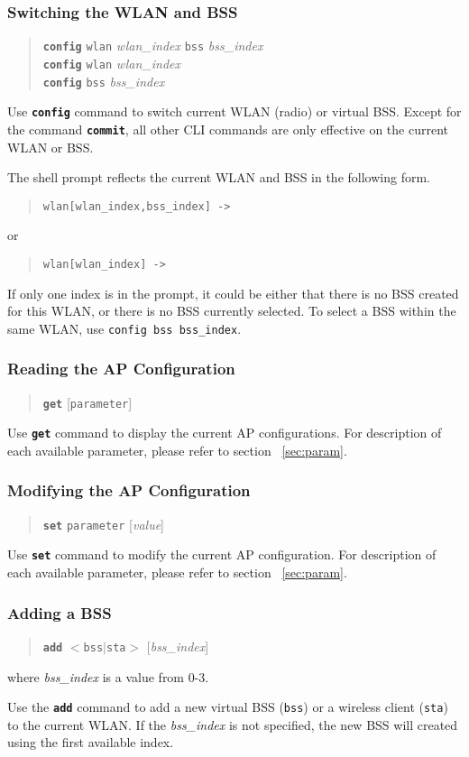 \documentclass[10pt,fullpage]{article}
\newcommand{\mytt}[1]{{\texttt{#1}}}
\newcommand{\bv}{\begin{verse}}
\newcommand{\ev}{\end{verse}}
\newcommand{\clicmd}[1]{{\textbf{\texttt{#1}}}}
\newcommand{\cliparam}[1]{{\texttt{#1}}}
\newcommand{\clival}[1]{{\emph{#1}}}
\begin{document}
\subsubsection{Switching the WLAN and BSS}
\bv
\clicmd{config} \cliparam{wlan} \clival{wlan\_index} \cliparam{bss}
\clival{bss\_index}\\
\clicmd{config} \cliparam{wlan} \clival{wlan\_index}\\
\clicmd{config} \cliparam{bss} \clival{bss\_index}\\
\ev

Use \clicmd{config} command to switch current WLAN (radio) or virtual BSS. 
Except for the command \clicmd{commit}, all other CLI commands are only effective on the
current WLAN or BSS.

The shell prompt reflects the current WLAN and BSS in the following form.
\bv
\mytt{wlan[wlan\_index,bss\_index] ->} 
\ev
or
\bv
\mytt{wlan[wlan\_index] -> }
\ev
If only one index is in the prompt, it could be either that there is no BSS
created for this WLAN, or there is no BSS currently selected. To select a BSS
within the same WLAN, use \mytt{config bss bss\_index}.

\subsubsection{Reading the AP Configuration}
\bv
\clicmd{get} [\cliparam{parameter}]
\ev
Use \clicmd{get} command to display the current AP configurations.
For description of each available parameter, please refer to section
~\ref{sec:param}. 

\subsubsection{Modifying the AP Configuration}
\bv
\clicmd{set} \cliparam{parameter} [\clival{value}]
\ev
Use \clicmd{set} command to modify the current AP configuration.
For description of each available parameter, please refer to section
~\ref{sec:param}.

\subsubsection{Adding a BSS}
\bv
\clicmd{add} $<$\cliparam{bss}$|$\cliparam{sta}$>$ [\clival{bss\_index}]
\ev
where \clival{bss\_index} is a value from 0-3.

Use the \clicmd{add} command to add a new virtual BSS (\cliparam{bss}) or
a wireless client (\cliparam{sta}) to the current WLAN. 
If the \clival{bss\_index} is not specified, the new BSS will created
using the first available index.
\end{document}
